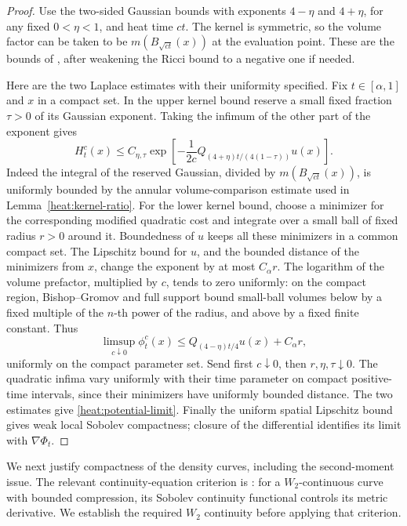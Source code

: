\begin{proof}
Use the two-sided Gaussian bounds with exponents
\(4-\eta\) and \(4+\eta\), for any fixed \(0<\eta<1\),
and heat time \(ct\). The kernel is symmetric, so the volume
factor can be taken to be \(m(B_{\sqrt{ct}}(x))\) at the
evaluation point. These are the bounds of
\cite[Theorem~1.2]{JiangLiZhang2016}, after weakening the Ricci
bound to a negative one if needed.

Here are the two Laplace estimates with their uniformity
specified. Fix \(t\in[\alpha,1]\) and \(x\) in a compact
set. In the upper kernel bound reserve a small fixed fraction
\(\tau>0\) of its Gaussian exponent. Taking the infimum of
the other part of the exponent gives
\[
H_t^c(x)\le C_{\eta,\tau}
\exp\left[-\frac1{2c}
Q_{(4+\eta)t/(4(1-\tau))}u(x)\right].
\]
Indeed the integral of the reserved Gaussian, divided by
\(m(B_{\sqrt{ct}}(x))\), is uniformly bounded by the annular
volume-comparison estimate used in
Lemma~\ref{heat:kernel-ratio}.
For the lower kernel bound, choose a minimizer for the
corresponding modified quadratic cost and integrate over a
small ball of fixed radius \(r>0\) around it. Boundedness of
\(u\) keeps all these minimizers in a common compact set.
The Lipschitz bound for \(u\), and the bounded distance of
the minimizers from \(x\), change the exponent by at most
\(C_\alpha r\). The logarithm of the volume prefactor,
multiplied by \(c\), tends to zero uniformly: on the compact
region, Bishop--Gromov and full support bound small-ball
volumes below by a fixed multiple of the \(n\)-th power of
the radius, and above by a fixed finite constant. Thus
\[
\limsup_{c\downarrow0}\phi_t^c(x)
\le Q_{(4-\eta)t/4}u(x)+C_\alpha r,
\]
uniformly on the compact parameter set. Send first
\(c\downarrow0\), then \(r,\eta,\tau\downarrow0\).
The quadratic infima vary uniformly with their time parameter
on compact positive-time intervals, since their minimizers
have uniformly bounded distance. The two estimates give
\eqref{heat:potential-limit}. Finally the uniform spatial
Lipschitz bound gives weak local Sobolev compactness; closure
of the differential identifies its limit with \(\nabla\Phi_t\).
\end{proof}

We next justify compactness of the density curves, including
the second-moment issue. The relevant continuity-equation
criterion is \cite[Theorem~3.5]{GigliHan2015}: for a
\(W_2\)-continuous curve with bounded compression, its
Sobolev continuity functional controls its metric derivative.
We establish the required \(W_2\) continuity before applying
that criterion.

